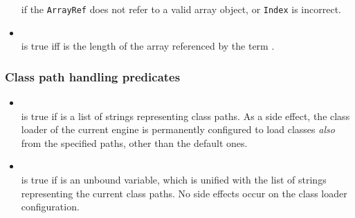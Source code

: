 \begin{itemize}
%


     if the \texttt{ArrayRef} does not refer to a valid array object, or \texttt{Index} is incorrect.

\item {}\\
    \noindent{} is true iff  is the length of the array referenced by
    the term .

\end{itemize}

\subsubsection{Class path handling predicates}

\begin{itemize}
\item {}\\
    \noindent{} is true if  is a list of strings representing class paths. As a side effect, the \tuprolog{} class loader of the current \tuprolog{} engine is permanently configured to load classes \textit{also} from the specified paths, other than the default ones.


\item {}\\
    \noindent{} is true if  is an unbound variable, which is unified with the list of strings representing the current class paths. No side effects occur on the \tuprolog{} class loader configuration.

\end{itemize}

